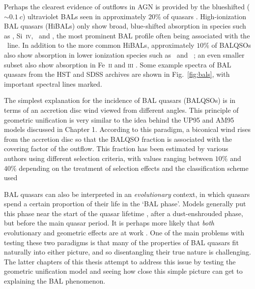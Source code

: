 Perhaps the clearest evidence of outflows in AGN is provided by  
the blueshifted ($\sim 0.1~c$) ultraviolet 
BALs seen in approximately $20\%$ of quasars
\citep{weymann1991, knigge2008, dai2008, allen2011}. 
High-ionization BAL quasars (HiBALs)
only show broad, blue-shifted absorption in species such as 
\civ, Si~\textsc{iv}, \nv\ and \ovi, the most prominent BAL
profile often being associated with the \civline\ line.
In addition to the more common HiBALs, 
approximately $10\%$ of BALQSOs also show absorption
in lower ionization species such as \mgii\ and \aliii\ 
\citep[LoBALs;][]{voit1993,gibson2009};
an even smaller subset also show absorption in Fe~\textsc{ii} and 
\textsc{iii} \citep[FeLoBALs;][]{becker2000,hall2002}. 
Some example spectra of BAL quasars from the HST and SDSS archives are shown in 
Fig.~\ref{fig:bals}, with important spectral lines marked.

The simplest explanation for the incidence of 
BAL quasars (BALQSOs) is in terms of an accretion disc wind viewed
from different angles. This principle of geometric unification
is very similar to the idea behind the UP95 and AM95 models discussed in Chapter 1.
According to this paradigm, a biconical wind rises from 
the accretion disc so that the BALQSO fraction is associated with
the covering factor of the outflow. This fraction
has been estimated by various authors using different 
selection criteria, with 
values ranging between $10\%$ and $40\%$ depending on the treatment 
of selection effects and the classification scheme used 
\citep{weymann1991, trump2006, knigge2008, dai2008, allen2011}

BAL quasars can also be interpreted in an {\em evolutionary}
context, in which quasars spend a certain proportion of their life
in the `BAL phase'. Models generally put this phase near the start
of the quasar lifetime \citep{hazard1984,surdej1987,boroson1992,zubovas2013}, 
after a dust-enshrouded phase, but before
the main quasar period. It is perhaps more likely that {\em both} 
evolutionary and geometric effects are at work \citep{borguet2010,dai2012}.
One of the main problems with testing these two paradigms is that many of
the properties of BAL quasars fit naturally into either picture, and so
disentangling their true nature is challenging. 
The latter chapters of this thesis attempt to address this issue by testing the 
geometric unification model
and seeing how close this simple picture can get to explaining 
the BAL phenomenon.  

